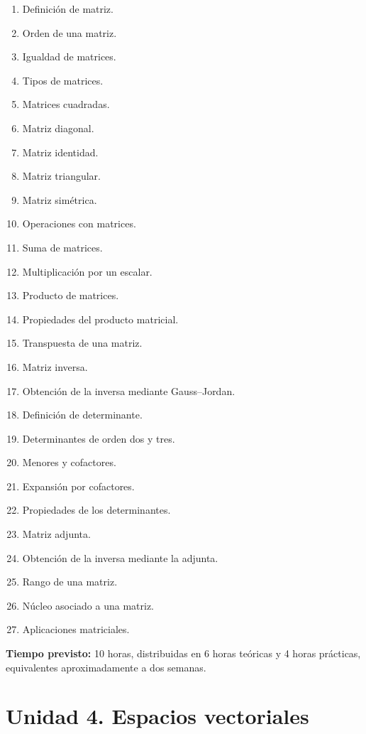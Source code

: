 \documentclass[12pt]{article}
\begin{document}
\begin{enumerate}
    \item Definición de matriz.
    \item Orden de una matriz.
    \item Igualdad de matrices.
    \item Tipos de matrices.
    \item Matrices cuadradas.
    \item Matriz diagonal.
    \item Matriz identidad.
    \item Matriz triangular.
    \item Matriz simétrica.
    \item Operaciones con matrices.
    \item Suma de matrices.
    \item Multiplicación por un escalar.
    \item Producto de matrices.
    \item Propiedades del producto matricial.
    \item Transpuesta de una matriz.
    \item Matriz inversa.
    \item Obtención de la inversa mediante Gauss--Jordan.
    \item Definición de determinante.
    \item Determinantes de orden dos y tres.
    \item Menores y cofactores.
    \item Expansión por cofactores.
    \item Propiedades de los determinantes.
    \item Matriz adjunta.
    \item Obtención de la inversa mediante la adjunta.
    \item Rango de una matriz.
    \item Núcleo asociado a una matriz.
    \item Aplicaciones matriciales.
\end{enumerate}

\textbf{Tiempo previsto:} 10 horas, distribuidas en 6 horas teóricas
y 4 horas prácticas, equivalentes aproximadamente a dos semanas.

\section{Unidad 4. Espacios vectoriales}
\end{document}
